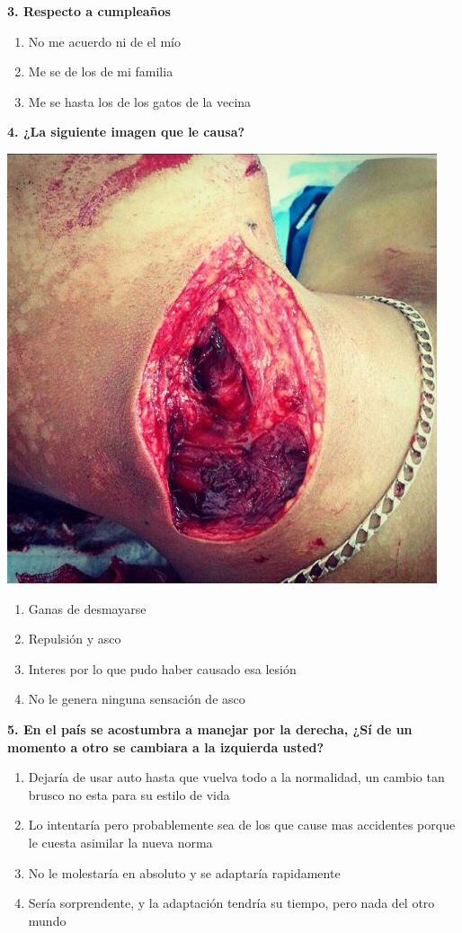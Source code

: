 \documentclass{article}
\begin{document}
\textbf{3. Respecto a cumpleaños}
\begin{enumerate}[label=(\Alph*)]
\item No me acuerdo ni de el mío
\item Me se de los de mi familia
\item Me se hasta los de los gatos de la vecina
 \end{enumerate}
\pagebreak
\textbf{4. ¿La siguiente imagen que le causa?} \\
\begin{multicols}{2}
 \includegraphics[scale=0.3]{foto.jpg}
 \columnbreak
\begin{enumerate}[label=(\Alph*)] 
\item Ganas de desmayarse
\item Repulsión y asco
\item Interes por lo que pudo haber causado esa lesión
\item No le genera ninguna sensación de asco
\end{enumerate}
\end{multicols}
\textbf{5. En el país se acostumbra a manejar por la derecha, ¿Sí de un momento a otro se cambiara a la izquierda usted?}
\begin{enumerate}[label=(\Alph*)] 
\item Dejaría de usar auto hasta que vuelva todo a la normalidad, un cambio tan brusco no esta para su estilo de vida
\item Lo intentaría pero probablemente sea de los que cause mas accidentes porque le cuesta asimilar la nueva norma
\item No le molestaría en absoluto y se adaptaría rapidamente
\item Sería sorprendente, y la adaptación tendría su tiempo, pero nada del otro mundo
\end{enumerate}
\end{document}
